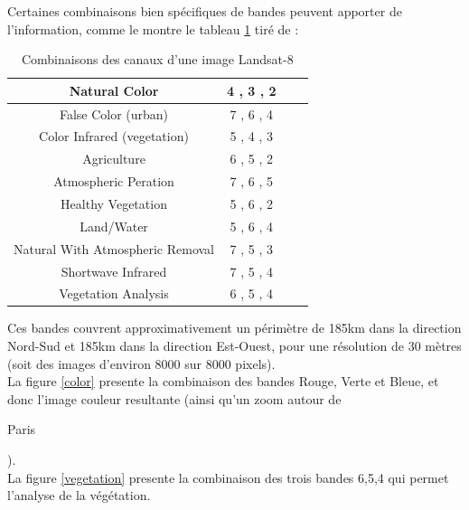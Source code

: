 \documentclass{book}
\begin{document}
\clearpage

Certaines combinaisons bien spécifiques de bandes peuvent apporter de l'information, comme le montre le tableau \ref{combinaison}
tiré de \cite{esri}:\\

\begin{table}
\begin{center}
\begin{tabular}{|c|c|c|c|}
\hline
Natural Color & 4 , 3 , 2\\
\hline
False Color (urban) & 7 , 6 , 4\\
\hline
Color Infrared (vegetation) & 5 , 4 , 3\\
\hline
Agriculture & 6 , 5 , 2\\
\hline
Atmospheric Peration & 7 , 6 , 5\\
\hline
Healthy Vegetation & 5 , 6 , 2\\
\hline
Land/Water & 5 , 6 , 4\\
\hline
Natural With Atmospheric Removal & 7 , 5 , 3\\
\hline
Shortwave Infrared & 7 , 5 , 4\\
\hline
Vegetation Analysis & 6 , 5 , 4\\
\hline
\end{tabular}
\end{center}
\caption{Combinaisons des canaux d'une image Landsat-8}
\label{combinaison}
\end{table}
\clearpage

Ces bandes couvrent approximativement un périmètre de 185km dans la direction Nord-Sud et 185km
dans la direction Est-Ouest, pour une résolution de 30 mètres (soit des images d'environ 8000 sur 8000 pixels).\\
La figure \ref{color} presente la combinaison des bandes Rouge, Verte et Bleue, et donc l'image couleur resultante 
(ainsi qu'un zoom autour de \begin{itshape}Paris\end{itshape}).\\
La figure \ref{vegetation} presente la combinaison des trois bandes 6,5,4 qui permet l'analyse de la végétation.\\
\end{document}
